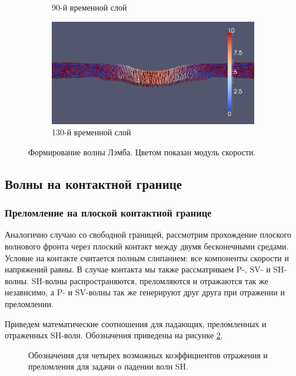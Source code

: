 \begin{figure}[htp]
\begin{subfigure}[b]{0.5\textwidth}
\caption{90-й временной слой}
\end{subfigure}
\begin{subfigure}[b]{0.5\textwidth}
\centering
\includegraphics[width=\textwidth]{png/lamb-wave/130.png}
\caption{130-й временной слой}
\end{subfigure}
\caption{Формирование волны Лэмба. Цветом показан модуль скорости.}
\label{pic:lamb_wave}
\end{figure}


\clearpage
\newpage


\subsection{Волны на контактной границе}

\subsubsection{Преломление на плоской контактной границе}

Аналогично случаю со свободной границей, рассмотрим прохождение плоского волнового фронта через плоский контакт между двумя бесконечными средами. Условие на контакте считается полным слипанием: все компоненты скорости и напряжений равны. В случае контакта мы также рассматриваем P-, SV- и SH-волны. SH-волны распространяются, преломляются и отражаются так же независимо, а P- и SV-волны так же генерируют друг друга при отражении и преломлении. 

Приведем математические соотношения для падающих, преломленных и отраженных SH-волн. Обозначения приведены на рисунке \ref{fig31}.

\begin{figure}[h]
\caption{Обозначения для четырех возможных коэффициентов отражения и преломления для задачи о падении волн SH.}
\label{fig31}
\end{figure}


